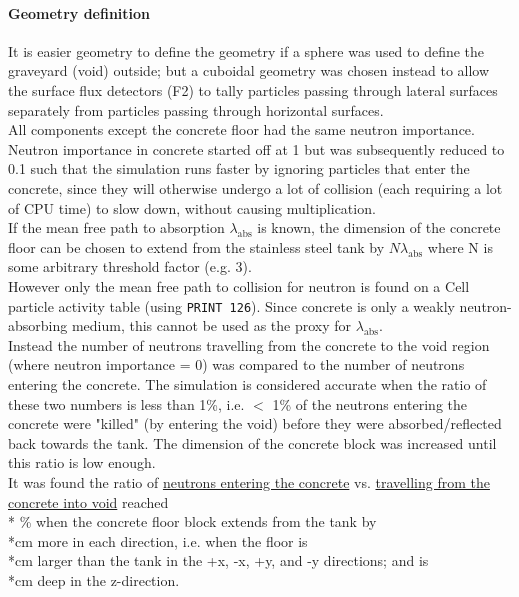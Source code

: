 \documentclass[a4paper, 12pt]{article}
\begin{document}
\paragraph{Geometry definition}
It is easier geometry to define the geometry if a sphere was used to define the graveyard (void) outside; but a cuboidal geometry was chosen instead to allow the surface flux detectors (F2) to tally particles passing through lateral surfaces separately from particles passing through horizontal surfaces.
\\All components except the concrete floor had the same neutron importance. Neutron importance in concrete started off at 1 but was subsequently reduced to 0.1 such that the simulation runs faster by ignoring particles that enter the concrete, since they will otherwise undergo a lot of collision (each requiring a lot of CPU time) to slow down, without causing multiplication.
\\If the mean free path to absorption $\lambda_{\text{abs}}$ is known, the dimension of the concrete floor can be chosen to extend from the stainless steel tank by $N\lambda_{\text{abs}}$ where N is some arbitrary threshold factor (e.g. 3).
\\However only the mean free path to collision for neutron is found on a Cell particle activity table (using \texttt{PRINT 126}). Since concrete is only a weakly neutron-absorbing medium, this cannot be used as the proxy for $\lambda_{\text{abs}}$.
\\Instead the number of neutrons travelling from the concrete to the void region (where neutron importance = 0) was compared to the number of neutrons entering the concrete. The simulation is considered accurate when the ratio of these two numbers is less than 1\%, i.e. $<$ 1\% of the neutrons entering the concrete were "killed" (by entering the void) before they were absorbed/reflected back towards the tank. The dimension of the concrete block was increased until this ratio is low enough.
\\It was found the ratio of \underline{neutrons entering the concrete} vs. \underline{travelling from the concrete into void} reached \\* \% when the concrete floor block extends from the tank by \\*cm more in each direction, i.e. when the floor is \\*cm larger than the tank in the +x, -x, +y, and -y directions; and is \\*cm deep in the z-direction.
\end{document}
